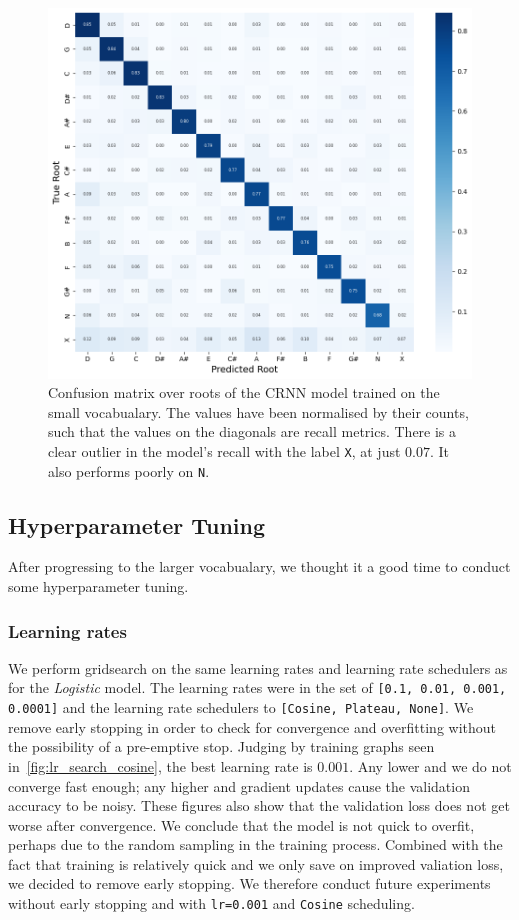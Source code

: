 \begin{figure}[h]
    \centering
    \includegraphics[width=1.0\textwidth]{figures/small_vocab_root_cm.png}
    \caption{Confusion matrix over roots of the CRNN model trained on the small vocabualary. The values have been normalised by their counts, such that the values on the diagonals are recall metrics. There is a clear outlier in the model's recall with the label \texttt{X}, at just $0.07$. It also performs poorly on \texttt{N}.}\label{fig:crnn_small_vocab_cm}
\end{figure}

\subsection{Hyperparameter Tuning}

After progressing to the larger vocabualary, we thought it a good time to conduct some hyperparameter tuning. 

\subsubsection{Learning rates}

We perform gridsearch on the same learning rates and learning rate schedulers as for the \emph{Logistic} model. The learning rates were in the set of \texttt{[0.1, 0.01, 0.001, 0.0001]} and the learning rate schedulers to \texttt{[Cosine, Plateau, None]}. We remove early stopping in order to check for convergence and overfitting without the possibility of a pre-emptive stop. Judging by training graphs seen in~\ref{fig:lr_search_cosine}, the best learning rate is $0.001$. Any lower and we do not converge fast enough; any higher and gradient updates cause the validation accuracy to be noisy. These figures also show that the validation loss does not get worse after convergence. We conclude that the model is not quick to overfit, perhaps due to the random sampling in the training process. Combined with the fact that training is relatively quick and we only save on improved valiation loss, we decided to remove early stopping. We therefore conduct future experiments without early stopping and with \texttt{lr=0.001} and \texttt{Cosine} scheduling.

